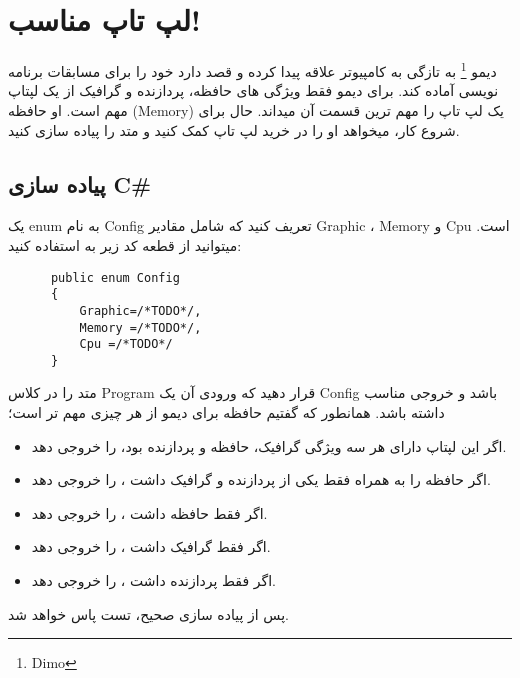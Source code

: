 
    \section{
    لپ تاپ مناسب!
    \grayBox{\textcolor{purple}{C\#}}
     \grayBox{\textcolor{green}{Java}}
    }
    دیمو
    \footnote{Dimo}
    به تازگی به کامپیوتر علاقه پیدا کرده و قصد دارد خود را برای مسابقات برنامه نویسی آماده کند.
    برای دیمو فقط ویژگی های 
    حافظه،
    پردازنده 
    و گرافیک از یک لپتاپ مهم است.
    او حافظه
    (Memory) 
    یک لپ تاپ را مهم ترین قسمت آن میداند.
    حال برای شروع کار، میخواهد او را در خرید لپ تاپ کمک کنید و متد 
    \grayBox{\textcolor{blue}{ChooseBest}}
    را پیاده سازی کنید.
    \subsection{پیاده سازی C\#}
    \RTL
    یک 
    enum
    به نام 
    Config
    تعریف کنید که شامل مقادیر 
    Graphic
    ،
    Memory
    و
    Cpu
    است.
    میتوانید از قطعه کد زیر به استفاده کنید:
    \LTR
    \begin{lstlisting}
      public enum Config
      {
          Graphic=/*TODO*/,
          Memory =/*TODO*/,
          Cpu =/*TODO*/
      }
    \end{lstlisting}
    \RTL
    متد 
    \grayBox{\textcolor{blue}{ChooseBest}}
    را در کلاس 
    Program
    قرار دهید 
    که ورودی آن یک 
    Config 
    باشد و خروجی مناسب داشته باشد.
    همانطور که گفتیم حافظه برای دیمو از هر چیزی مهم تر است؛
    \begin{itemize}
      
        \item 
    اگر این لپتاپ دارای هر سه ویژگی گرافیک، حافظه و پردازنده بود، 
    را خروجی دهد.
    
        \item
        
    اگر حافظه را به همراه فقط یکی از پردازنده و گرافیک داشت
    ،
    را خروجی دهد.
    
    \item
        
    اگر فقط حافظه داشت
    ،
    را خروجی دهد.
    
    \item
        
    اگر فقط گرافیک داشت
    ،
    را خروجی دهد.
    
    \item
        
    اگر فقط پردازنده داشت
    ،
    را خروجی دهد.
    \end{itemize}
    پس از پیاده سازی صحیح، تست 
    \grayBox{\textcolor{dkgreen}{ChooseBest\_Tests}}
    پاس خواهد شد.
    \\
